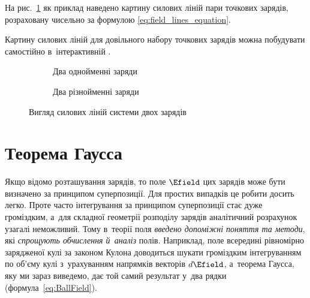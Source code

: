 На рис.~\ref{pic:force_line} як приклад наведено картину силових ліній пари точкових
зарядів, розраховану чисельно за формулою \eqref{eq:field_lines_equation}.

\begin{Simulation}
Картину силових ліній для довільного набору точкових
зарядів можна побудувати самостійно в~інтерактивній
.
\end{Simulation}

\begin{figure}[h!]
	\centering
	\begin{subfigure}[t]{0.45\linewidth}
		\centering
		\caption{Два однойменні заряди}
	\end{subfigure}
	\hfill
	\begin{subfigure}[t]{0.45\linewidth}
		\centering
		\caption{Два різнойменні заряди}
	\end{subfigure}
	\caption{Вигляд силових ліній системи двох зарядів}
	\label{pic:force_line}
\end{figure}



\section{Теорема Гаусса}\label{sec:Gauss}\hypertarget{gauss-theorem}{}

Якщо відомо розташування зарядів, то поле $\Efield$ цих зарядів може бути визначено за
принципом суперпозиції. Для простих випадків це робити досить легко. Проте часто
інтегрування за принципом суперпозиції стає дуже громіздким, а~для складної геометрії
розподілу зарядів аналітичний розрахунок узагалі неможливий. Тому в~теорії поля
\emph{введено допоміжні поняття та методи}, які \emph{спрощують обчислення й~аналіз}
полів. Наприклад, поле всередині рівномірно зарядженої кулі за законом Кулона
доводиться шукати громіздким інтегруванням по об'єму кулі з~урахуванням напрямків векторів
$d\Efield$, а~теорема Гаусса, яку ми зараз виведемо, дає той самий результат у~два рядки
(формула~\eqref{eq:BallField}).



